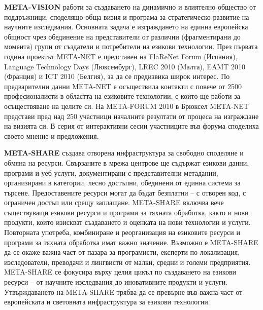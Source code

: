 \documentclass[]{../../metanetpaper}
\begin{document}
\begin{multicols}{2}
\textbf{META-VISION} работи за създаването на динамично и влиятелно
общество от поддръжници, споделящо обща визия и програма за
стратегическо развитие на научните изследвания. Основната задача е
изграждането на единна европейска общност чрез обединение на
представители от различни (фрагментирани до момента) групи от
създатели и потребители на езикови технологии. През първата година
проектът META-NET е представен на FlaReNet Forum (Испания), Language
Technology Days (Люксембург), LREC 2010
(Mалта), EAMT 2010 (Франция) и ICT 2010 (Белгия), за да се предизвика
широк интерес.  По предварителни данни META-NET е осъществила контакти
с повече от 2500 професионалисти в областта на езиковите технологии, с
които ще работи за осъществяване на целите си. На META-FORUM 2010 в
Брюксел META-NET представи пред над 250 участници началните резултати
от процеса на изграждане на визията си. В серия от интерактивни сесии
участниците във форума споделиха своето мнение и предложения.

\textbf{META-SHARE} създава отворена инфраструктура за свободно
споделяне и обмяна на ресурси. Свързаните в мрежа центрове ще съдържат
езикови данни, програми и уеб услуги, документирани с представителни
метаданни, организирани в категории, лесно достъпни, обединени от
единна система за търсене.  Предоставените ресурси могат да бъдат
безплатни -- с отворен код, с ограничен достъп или срещу
заплащане. META-SHARE включва вече съществуващи езикови ресурси и
програми за тяхната обработка, както и нови продукти, които изискват
създаването и оценката на нови технологии и услуги.  Повторната
употреба, комбиниране и реорганизация на езиковите ресурси и програми
за тяхната обработка имат важно значение. Възможно е META-SHARE да се
окаже важна част от пазара за програмисти, експерти по локализация,
изследователи, преводачи и лингвисти от малки, средни и големи
предприятия. META-SHARE се фокусира върху целия цикъл по създаването
на езикови ресурси – от научните изследвания до иновативните продукти
и услуги. Утвърждаването на META-SHARE трябва да се превърне във важна
част от европейската и световната инфраструктура за езикови
технологии.


\end{multicols}
\end{document}
